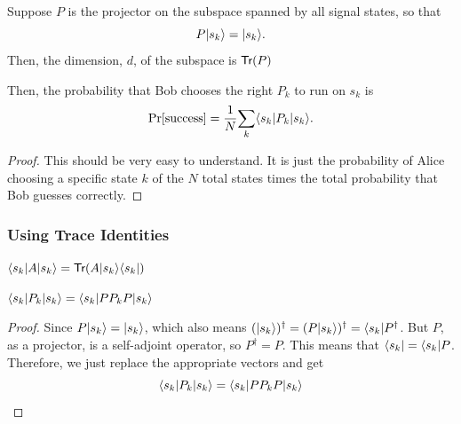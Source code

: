 \documentclass[12pt]{article}
\begin{document}
\begin{proposition}\label{prop:projector-on-states}
Suppose $P$ is the projector on the subspace spanned by all signal states, so that $$
P \Ket{s_k} = \Ket{s_k}.
$$ Then, the dimension, \underline{$d$}, of the subspace is $\Trace{P}$
\end{proposition}

\begin{proposition}
Then, the probability that Bob chooses the right $P_k$ to run on $s_k$ is $$
\Pr[\text{success}] = \frac{1}{N}\underset{k}{\sum}\Bra{s_k}P_k\Ket{s_k}.
$$
\end{proposition}
\begin{proof}
This should be very easy to understand. It is just the probability of Alice choosing a specific state $k$ of the $N$ total states times the total probability that Bob guesses correctly.
\end{proof}

\subsubsection{Using Trace Identities}
\begin{proposition}[Recall]\label{prop:prob-to-trace-identity}
$\Bra{s_k} A \Ket{s_k} = \Trace{A\Ket{s_k}\Bra{s_k}}$
\end{proposition}

\begin{proposition}\label{prop:replace-P_k-by-PP_kP}
$\Bra{s_k} P_k \Ket{s_k} = \Bra{s_k}P P_k P\Ket{s_k}$
\end{proposition}
\begin{proof}
Since $P\Ket{s_k} = \Ket{s_k}$, which also means $(\Ket{s_k})^\dag= (P\Ket{s_k})^\dag = \Bra{s_k}P^\dag$. But $P$, as a projector, is a self-adjoint operator, so $P^\dag = P$. This means that $\Bra{s_k} = \Bra{s_k}P$. Therefore, we just replace the appropriate vectors and get $$
\Bra{s_k} P_k \Ket{s_k} = \Bra{s_k}P P_k P\Ket{s_k}
$$
\end{proof}
\end{document}

